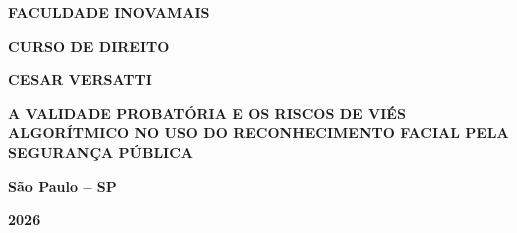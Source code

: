 \documentclass[12pt,a4paper]{article}
\begin{document}
\begin{titlepage}
\begin{center}
\vspace*{1cm}

{\large \textbf{FACULDADE INOVAMAIS}}

\vspace{0.5cm}
{\large \textbf{CURSO DE DIREITO}}

\vspace{6cm}

{\large \textbf{CESAR VERSATTI}}

\vspace{3cm}

{\LARGE \textbf{A VALIDADE PROBATÓRIA E OS RISCOS DE VIÉS ALGORÍTMICO NO USO DO RECONHECIMENTO FACIAL PELA SEGURANÇA PÚBLICA}}

\vspace{4cm}

{\large \textbf{São Paulo -- SP}}

\vspace{0.5cm}
{\large \textbf{2026}}

\end{center}
\end{titlepage}
\end{document}
